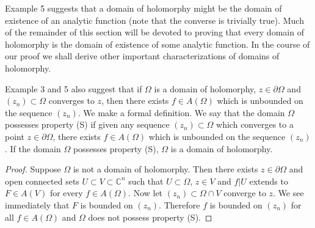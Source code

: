 Example 5 suggests that a domain of holomorphy might be the domain of existence of an analytic function (note that the converse is trivially true). Much of the remainder of this section will be devoted to proving that every domain of holomorphy is the domain of existence of some analytic function. In the course of our proof we shall derive other important characterizations of domains of holomorphy.

Example 3 and 5 also suggest that if $\Omega$ is a domain of holomorphy, $z\in\partial\Omega$ and $(z_n)\subset\Omega$ converges to $z$, then there exists $f\in A(\Omega)$ which is unbounded on the sequence $(z_n)$. We make a formal definition.
 We say that the domain $\Omega$ possesses property (S) if given any sequence $(z_n)\subset\Omega$ which converges to a point $z\in\partial\Omega$, there exists $f\in A(\Omega)$ which is unbounded on the sequence $(z_n)$.
 If the domain $\Omega$ possesses property (S), $\Omega$ is a domain of holomorphy.
\begin{proof}
Suppose $\Omega$ is not a domain of holomorphy. Then there exists $z\in\partial\Omega$ and open connected sets $U\subset V\subset\mathbb C^n$ such that $U\subset\Omega$, $z\in V$ and $f|U$ extends to $F\in A(V)$ for every $f\in A(\Omega)$. Now let $(z_n)\subset\Omega\cap V$ converge to $z$. We see immediately that $F$ is bounded on $(z_n)$. Therefore $f$ is bounded on $(z_n)$ for all $f\in A(\Omega)$ and $\Omega$ does not possess property (S).
\end{proof}

